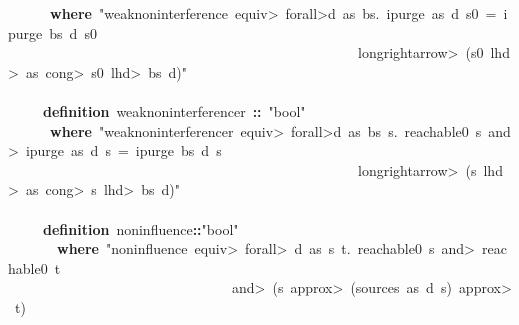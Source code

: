 \documentclass{article}
\newcommand{\syntaxKEYWORDA}[1]{\textcolor[rgb]{0.0,0.4,0.6}{\textbf{#1}}}
\newcommand{\syntaxKEYWORDB}[1]{\textcolor[rgb]{0.0,0.6,0.4}{\textbf{#1}}}
\newcommand{\syntaxLITERALA}[1]{\textcolor[rgb]{1.0,0.0,0.8}{#1}}
\newcommand{\syntaxOPERATOR}[1]{\textcolor[rgb]{0.0,0.0,0.0}{\textbf{#1}}}
\newcommand{\syntaxKEYWORDA}[1]{\textcolor[rgb]{0.0,0.4,0.6}{\textbf{#1}}}
\newcommand{\syntaxKEYWORDB}[1]{\textcolor[rgb]{0.0,0.6,0.4}{\textbf{#1}}}
\newcommand{\syntaxLITERALA}[1]{\textcolor[rgb]{1.0,0.0,0.8}{#1}}
\newcommand{\syntaxOPERATOR}[1]{\textcolor[rgb]{0.0,0.0,0.0}{\textbf{#1}}}
\newcommand{\syntaxKEYWORDA}[1]{\textcolor[rgb]{0.0,0.4,0.6}{\textbf{#1}}}
\newcommand{\syntaxKEYWORDB}[1]{\textcolor[rgb]{0.0,0.6,0.4}{\textbf{#1}}}
\newcommand{\syntaxLITERALA}[1]{\textcolor[rgb]{1.0,0.0,0.8}{#1}}
\newcommand{\syntaxOPERATOR}[1]{\textcolor[rgb]{0.0,0.0,0.0}{\textbf{#1}}}
\newcommand{\syntaxKEYWORDA}[1]{\textcolor[rgb]{0.0,0.4,0.6}{#1}}
\newcommand{\syntaxKEYWORDB}[1]{\textcolor[rgb]{0.0,0.6,0.4}{#1}}
\newcommand{\syntaxLITERALA}[1]{\textcolor[rgb]{1.0,0.0,0.8}{\textbf{#1}}}
\newcommand{\syntaxOPERATOR}[1]{\textcolor[rgb]{0.0,0.0,0.0}{#1}}
\newcommand{\syntaxKEYWORDA}[1]{\textcolor[rgb]{0.0,0.4,0.6}{\textbf{#1}}}
\newcommand{\syntaxKEYWORDB}[1]{\textcolor[rgb]{0.0,0.6,0.4}{\textbf{#1}}}
\newcommand{\syntaxLITERALA}[1]{\textcolor[rgb]{1.0,0.0,0.8}{#1}}
\newcommand{\syntaxOPERATOR}[1]{\textcolor[rgb]{0.0,0.0,0.0}{\textbf{#1}}}
\newcommand{\syntaxKEYWORDA}[1]{\textcolor[rgb]{0.0,0.4,0.6}{\textbf{#1}}}
\newcommand{\syntaxKEYWORDB}[1]{\textcolor[rgb]{0.0,0.6,0.4}{\textbf{#1}}}
\newcommand{\syntaxLITERALA}[1]{\textcolor[rgb]{1.0,0.0,0.8}{#1}}
\newcommand{\syntaxOPERATOR}[1]{\textcolor[rgb]{0.0,0.0,0.0}{\textbf{#1}}}
\begin{document}
{\ }{\ }{\ }{\ }{\ }{\ }\syntaxKEYWORDB{where}{\ }\syntaxLITERALA{"weak\usebox{\underscorebox}noninterference{\ }\<equiv>{\ }\<forall>d{\ }as{\ }bs.{\ }ipurge{\ }as{\ }d{\ }s0{\ }={\ }ipurge{\ }bs{\ }d{\ }s0}\hspace*{\fill}\\
\syntaxLITERALA{{\ }{\ }{\ }{\ }{\ }{\ }{\ }{\ }{\ }{\ }{\ }{\ }{\ }{\ }{\ }{\ }{\ }{\ }{\ }{\ }{\ }{\ }{\ }{\ }{\ }{\ }{\ }{\ }{\ }{\ }{\ }{\ }{\ }{\ }{\ }{\ }{\ }{\ }{\ }{\ }{\ }{\ }{\ }{\ }{\ }{\ }{\ }{\ }{\ }{\ }\<longrightarrow>{\ }(s0{\ }\<lhd>{\ }as{\ }\<cong>{\ }s0{\ }\<lhd>{\ }bs{\ }\usebox{\atbox}{\ }d)"}\hspace*{\fill}\\
{\ }{\ }{\ }\hspace*{\fill}\\
{\ }{\ }{\ }{\ }{\ }\syntaxKEYWORDA{definition}{\ }weak\usebox{\underscorebox}noninterference\usebox{\underscorebox}r{\ }\syntaxOPERATOR{::}{\ }\syntaxLITERALA{"bool"}\hspace*{\fill}\\
{\ }{\ }{\ }{\ }{\ }{\ }\syntaxKEYWORDB{where}{\ }\syntaxLITERALA{"weak\usebox{\underscorebox}noninterference\usebox{\underscorebox}r{\ }\<equiv>{\ }\<forall>d{\ }as{\ }bs{\ }s.{\ }reachable0{\ }s{\ }\<and>{\ }ipurge{\ }as{\ }d{\ }s{\ }={\ }ipurge{\ }bs{\ }d{\ }s}\hspace*{\fill}\\
\syntaxLITERALA{{\ }{\ }{\ }{\ }{\ }{\ }{\ }{\ }{\ }{\ }{\ }{\ }{\ }{\ }{\ }{\ }{\ }{\ }{\ }{\ }{\ }{\ }{\ }{\ }{\ }{\ }{\ }{\ }{\ }{\ }{\ }{\ }{\ }{\ }{\ }{\ }{\ }{\ }{\ }{\ }{\ }{\ }{\ }{\ }{\ }{\ }{\ }{\ }{\ }{\ }\<longrightarrow>{\ }(s{\ }\<lhd>{\ }as{\ }\<cong>{\ }s{\ }\<lhd>{\ }bs{\ }\usebox{\atbox}{\ }d)"}\hspace*{\fill}\\
\hspace*{\fill}\\
{\ }{\ }{\ }{\ }{\ }\syntaxKEYWORDA{definition}{\ }noninfluence\syntaxOPERATOR{::}\syntaxLITERALA{"bool"}{\ }\hspace*{\fill}\\
{\ }{\ }{\ }{\ }{\ }{\ }{\ }\syntaxKEYWORDB{where}{\ }\syntaxLITERALA{"noninfluence{\ }\<equiv>{\ }\<forall>{\ }d{\ }as{\ }s{\ }t.{\ }reachable0{\ }s{\ }\<and>{\ }reachable0{\ }t}\hspace*{\fill}\\
\syntaxLITERALA{{\ }{\ }{\ }{\ }{\ }{\ }{\ }{\ }{\ }{\ }{\ }{\ }{\ }{\ }{\ }{\ }{\ }{\ }{\ }{\ }{\ }{\ }{\ }{\ }{\ }{\ }{\ }{\ }{\ }{\ }{\ }{\ }\<and>{\ }(s{\ }\<approx>{\ }(sources{\ }as{\ }d{\ }s){\ }\<approx>{\ }t)}\hspace*{\fill}\\
\end{document}
